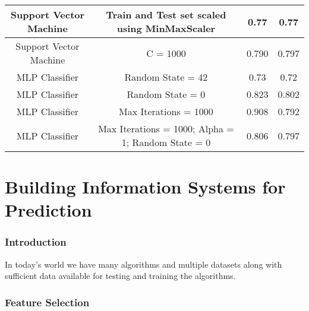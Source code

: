 \documentclass[12pt]{article}
\begin{document}
{\begin{landscape}
\begin{table}[]
\begin{tabular}{|c|c|c|c|}
Support Vector Machine & Train and Test set scaled using MinMaxScaler       & 0.77               & 0.77              \\ \hline
Support Vector Machine & C = 1000                                           & 0.790              & 0.797             \\ \hline
MLP Classifier         & Random State = 42                                  & 0.73               & 0.72              \\ \hline
MLP Classifier         & Random State = 0                                   & 0.823              & 0.802             \\ \hline
MLP Classifier         & Max Iterations = 1000                              & 0.908              & 0.792             \\ \hline
MLP Classifier         & Max Iterations = 1000; Alpha = 1; Random State = 0 & 0.806              & 0.797             \\ \hline
\end{tabular}
\end{table}
    \end{landscape}
    \clearpage%
}
\newpage
\part{Building Information Systems for Prediction}
\section{Introduction}
In today's world we have many algorithms and multiple datasets along with sufficient data available for testing and training the algorithms.



\section{Feature Selection}
\newpage
\end{document}
